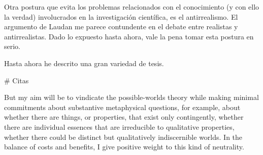 


Otra postura que evita los problemas relacionados con el conocimiento (y con ello la verdad) involucrados en la investigación científica, es el antirrealismo. El argumento de Laudan me parece contundente en el debate entre realistas y antirrealistas. Dado lo expuesto hasta ahora, vale la pena tomar esta postura en serio.

Hasta ahora he descrito una gran variedad de tesis. 


# Citas

But my aim will be to vindicate the possible-worlds theory while making minimal commitments about substantive metaphysical questions, for example, about whether there are things, or properties, that exist only contingently, whether there are individual essences that are irreducible to qualitative properties, whether there could be distinct but qualitatively indiscernible worlds. In the balance of costs and benefits, I give positive weight to this kind of neutrality. \cite{Stalnaker2012-STAMPM-2}
